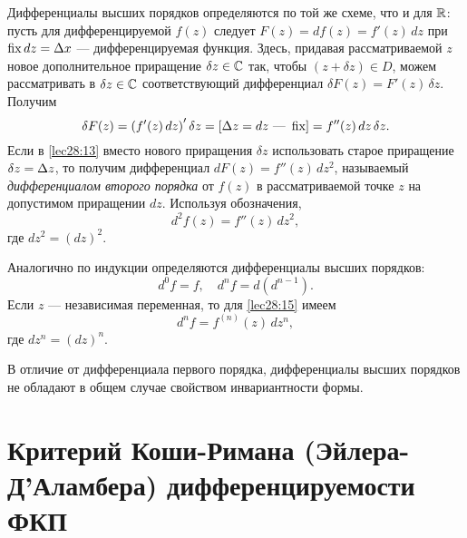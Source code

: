 \documentclass[../../main.tex]{subfiles}
\begin{document}
Дифференциалы высших порядков определяются по той же схеме, что и для $\mathbb{R}$:
пусть для дифференцируемой $f(z)$ следует $F(z) = d f(z) = f'(z)\, dz$ при
$\operatorname{fix} dz = \Delta x$ --- дифференцируемая функция. Здесь, придавая рассматриваемой
$z$ новое дополнительное приращение $\delta z \in \mathbb{C}$ так, чтобы
$\left(z + \delta z\right) \in D$, можем рассматривать в $\delta z \in \mathbb{C}$
соответствующий дифференциал $\delta F(z) = F'(z)\, \delta z$.
Получим
\begin{equation}
\label{lec28:13}
\delta F(z) = \left(f'(z)\, dz\right)' \delta z =
\left[\Delta z = dz \text{ --- } \operatorname{fix}\right] = f''(z)\, dz\, \delta z.
\end{equation}
Если в \eqref{lec28:13} вместо нового приращения $\delta z$ использовать
старое приращение $\delta z = \Delta z$, то получим дифференциал
$d F(z) = f''(z)\, dz^2$, называемый \emph{дифференциалом второго порядка}
от $f(z)$ в рассматриваемой точке $z$ на допустимом приращении $dz$.
Используя обозначения,
\begin{equation}
\label{lec28:14}
d^2 f(z) = f''(z)\, dz^2,
\end{equation}
где $dz^2 = (dz)^2$.

Аналогично по индукции определяются дифференциалы высших порядков:
\begin{equation}
\label{lec28:15}
d^0 f = f, \quad
d^n f = d \left(d^{n - 1} \right).
\end{equation}
Если $z$ --- независимая переменная, то для \eqref{lec28:15} имеем
\begin{equation}
\label{lec28:16}
d^n f = f^{(n)} (z)\, dz^n,
\end{equation}
где $dz^n = (dz)^n$.

В отличие от дифференциала первого порядка,
дифференциалы высших порядков не обладают в общем случае свойством
инвариантности формы.

\section{Критерий Коши-Римана (Эйлера-Д'Аламбера) дифференцируемости ФКП}
\end{document}
